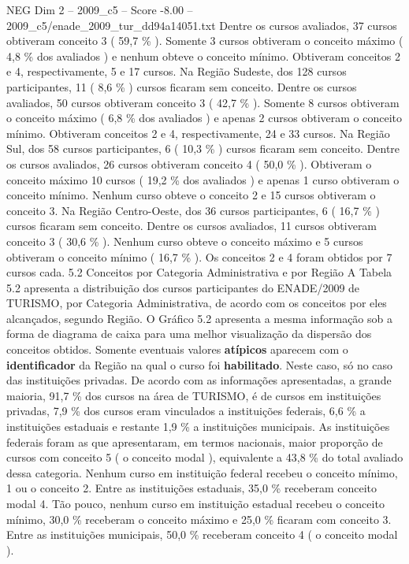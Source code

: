 \begin{textsample}{NEG Dim 2 – 2009\_c5 – Score -8.00 – 2009\_c5/enade\_2009\_tur\_dd94a14051.txt}
Dentre os cursos avaliados, 37 cursos obtiveram conceito 3 ( 59,7 \% ).
Somente 3 cursos obtiveram o conceito máximo ( 4,8 \% dos avaliados ) e nenhum obteve o conceito mínimo.
Obtiveram conceitos 2 e 4, respectivamente, 5 e 17 cursos.
Na Região Sudeste, dos 128 cursos participantes, 11 ( 8,6 \% ) cursos ficaram sem conceito.
Dentre os cursos avaliados, 50 cursos obtiveram conceito 3 ( 42,7 \% ).
Somente 8 cursos obtiveram o conceito máximo ( 6,8 \% dos avaliados ) e apenas 2 cursos obtiveram o conceito mínimo.
Obtiveram conceitos 2 e 4, respectivamente, 24 e 33 cursos.
Na Região Sul, dos 58 cursos participantes, 6 ( 10,3 \% ) cursos ficaram sem conceito.
Dentre os cursos avaliados, 26 cursos obtiveram conceito 4 ( 50,0 \% ).
Obtiveram o conceito máximo 10 cursos ( 19,2 \% dos avaliados ) e apenas 1 curso obtiveram o conceito mínimo.
Nenhum curso obteve o conceito 2 e 15 cursos obtiveram o conceito 3.
Na Região Centro-Oeste, dos 36 cursos participantes, 6 ( 16,7 \% ) cursos ficaram sem conceito.
Dentre os cursos avaliados, 11 cursos obtiveram conceito 3 ( 30,6 \% ).
Nenhum curso obteve o conceito máximo e 5 cursos obtiveram o conceito mínimo ( 16,7 \% ).
Os conceitos 2 e 4 foram obtidos por 7 cursos cada. 5.2 Conceitos por Categoria Administrativa e por Região A Tabela 5.2 apresenta a distribuição dos cursos participantes do ENADE/2009 de TURISMO, por Categoria Administrativa, de acordo com os conceitos por eles alcançados, segundo Região.
O Gráfico 5.2 apresenta a mesma informação sob a forma de diagrama de caixa para uma melhor visualização da dispersão dos conceitos obtidos.
Somente eventuais valores \textbf{atípicos} aparecem com o \textbf{identificador} da Região na qual o curso foi \textbf{habilitado}.
Neste caso, só no caso das instituições privadas.
De acordo com as informações apresentadas, a grande maioria, 91,7 \% dos cursos na área de TURISMO, é de cursos em instituições privadas, 7,9 \% dos cursos eram vinculados a instituições federais, 6,6 \% a instituições estaduais e restante 1,9 \% a instituições municipais.
As instituições federais foram as que apresentaram, em termos nacionais, maior proporção de cursos com conceito 5 ( o conceito modal ), equivalente a 43,8 \% do total avaliado dessa categoria.
Nenhum curso em instituição federal recebeu o conceito mínimo, 1 ou o conceito 2.
Entre as instituições estaduais, 35,0 \% receberam conceito modal 4.
Tão pouco, nenhum curso em instituição estadual recebeu o conceito mínimo, 30,0 \% receberam o conceito máximo e 25,0 \% ficaram com conceito 3.
Entre as instituições municipais, 50,0 \% receberam conceito 4 ( o conceito modal ).

\end{textsample}
